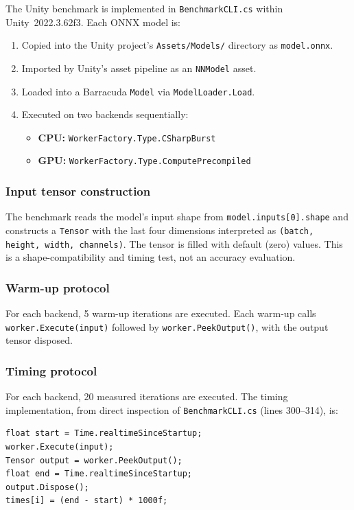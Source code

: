 \documentclass[10pt,twocolumn,letterpaper]{article}
\begin{document}
The Unity benchmark is implemented in \texttt{BenchmarkCLI.cs} within Unity~2022.3.62f3. Each ONNX model is:
\begin{enumerate}[nosep,leftmargin=*]
  \item Copied into the Unity project's \texttt{Assets/Models/} directory as \texttt{model.onnx}.
  \item Imported by Unity's asset pipeline as an \texttt{NNModel} asset.
  \item Loaded into a Barracuda \texttt{Model} via \texttt{ModelLoader.Load}.
  \item Executed on two backends sequentially:
    \begin{itemize}[nosep]
      \item \textbf{CPU:} \texttt{WorkerFactory.Type.CSharpBurst}
      \item \textbf{GPU:} \texttt{WorkerFactory.Type.ComputePrecompiled}
    \end{itemize}
\end{enumerate}

\subsubsection{Input tensor construction}

The benchmark reads the model's input shape from \texttt{model.inputs[0].shape} and constructs a \texttt{Tensor} with the last four dimensions interpreted as \texttt{(batch, height, width, channels)}. The tensor is filled with default (zero) values. This is a shape-compatibility and timing test, not an accuracy evaluation.

\subsubsection{Warm-up protocol}

For each backend, 5 warm-up iterations are executed. Each warm-up calls \texttt{worker.Execute(input)} followed by \texttt{worker.PeekOutput()}, with the output tensor disposed.

\subsubsection{Timing protocol}\label{sec:timing}

For each backend, 20 measured iterations are executed. The timing implementation, from direct inspection of \texttt{BenchmarkCLI.cs} (lines 300--314), is:

\begin{lstlisting}[basicstyle=\scriptsize\ttfamily,frame=single,language={[Sharp]C}]
float start = Time.realtimeSinceStartup;
worker.Execute(input);
Tensor output = worker.PeekOutput();
float end = Time.realtimeSinceStartup;
output.Dispose();
times[i] = (end - start) * 1000f;
\end{lstlisting}
\end{document}
